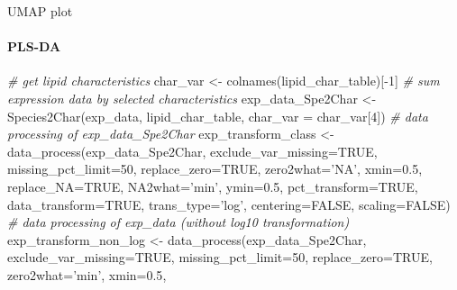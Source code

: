 \documentclass[]{article}
\newcommand{\hlnum}[1]{\textcolor[rgb]{0.816,0.125,0.439}{#1}}%
\newcommand{\hlstr}[1]{\textcolor[rgb]{0.251,0.627,0.251}{#1}}%
\newcommand{\hlcom}[1]{\textcolor[rgb]{0.502,0.502,0.502}{\textit{#1}}}%
\newcommand{\hlopt}[1]{\textcolor[rgb]{0,0,0}{#1}}%
\newcommand{\hlstd}[1]{\textcolor[rgb]{0.251,0.251,0.251}{#1}}%
\newcommand{\hlkwc}[1]{\textcolor[rgb]{0.251,0.251,0.251}{#1}}%
\newcommand{\hlkwd}[1]{\textcolor[rgb]{0.878,0.439,0.125}{#1}}%
\newenvironment{Shaded}{\begin{myshaded}}{\end{myshaded}}
\newcommand{\KeywordTok}[1]{\hlkwd{#1}}
\newcommand{\DataTypeTok}[1]{\hlkwc{#1}}
\newcommand{\DecValTok}[1]{\hlnum{#1}}
\newcommand{\FloatTok}[1]{\hlnum{#1}}
\newcommand{\StringTok}[1]{\hlstr{#1}}
\newcommand{\CommentTok}[1]{\hlcom{#1}}
\newcommand{\OtherTok}[1]{{#1}}
\newcommand{\OperatorTok}[1]{\hlopt{#1}}
\newcommand{\NormalTok}[1]{\hlstd{#1}}
\begin{document}
\label{fig:unnamed-chunk-51}UMAP plot

\hypertarget{pls-da-1}{%
\paragraph{PLS-DA}\label{pls-da-1}}

\begin{Shaded}
\begin{Highlighting}[]
\CommentTok{# get lipid characteristics}
\NormalTok{char_var <-}\StringTok{ }\KeywordTok{colnames}\NormalTok{(lipid_char_table)[}\OperatorTok{-}\DecValTok{1}\NormalTok{]}
\CommentTok{# sum expression data by selected characteristics}
\NormalTok{exp_data_Spe2Char <-}\StringTok{ }\KeywordTok{Species2Char}\NormalTok{(exp_data, lipid_char_table,}
                                  \DataTypeTok{char_var =}\NormalTok{ char_var[}\DecValTok{4}\NormalTok{])}
\CommentTok{# data processing of exp_data_Spe2Char}
\NormalTok{exp_transform_class <-}\StringTok{ }\KeywordTok{data_process}\NormalTok{(exp_data_Spe2Char, }
                                    \DataTypeTok{exclude_var_missing=}\OtherTok{TRUE}\NormalTok{,}
                                    \DataTypeTok{missing_pct_limit=}\DecValTok{50}\NormalTok{, }\DataTypeTok{replace_zero=}\OtherTok{TRUE}\NormalTok{,}
                                    \DataTypeTok{zero2what=}\StringTok{'NA'}\NormalTok{, }\DataTypeTok{xmin=}\FloatTok{0.5}\NormalTok{, }\DataTypeTok{replace_NA=}\OtherTok{TRUE}\NormalTok{,}
                                    \DataTypeTok{NA2what=}\StringTok{'min'}\NormalTok{, }\DataTypeTok{ymin=}\FloatTok{0.5}\NormalTok{, }
                                    \DataTypeTok{pct_transform=}\OtherTok{TRUE}\NormalTok{,}
                                    \DataTypeTok{data_transform=}\OtherTok{TRUE}\NormalTok{, }\DataTypeTok{trans_type=}\StringTok{'log'}\NormalTok{,}
                                    \DataTypeTok{centering=}\OtherTok{FALSE}\NormalTok{, }\DataTypeTok{scaling=}\OtherTok{FALSE}\NormalTok{)}
\CommentTok{# data processing of exp_data (without log10 transformation)}
\NormalTok{exp_transform_non_log <-}\StringTok{ }\KeywordTok{data_process}\NormalTok{(exp_data_Spe2Char,}
                                      \DataTypeTok{exclude_var_missing=}\OtherTok{TRUE}\NormalTok{,}
                                      \DataTypeTok{missing_pct_limit=}\DecValTok{50}\NormalTok{,}
                                      \DataTypeTok{replace_zero=}\OtherTok{TRUE}\NormalTok{,}
                                      \DataTypeTok{zero2what=}\StringTok{'min'}\NormalTok{, }\DataTypeTok{xmin=}\FloatTok{0.5}\NormalTok{,}

\end{Highlighting}
\end{Shaded}
\end{document}
